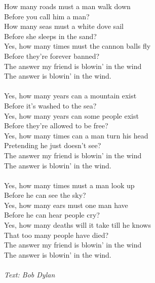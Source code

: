 \vspace{10pt}
How many roads must a man walk down\\
Before you call him a man?\\
How many seas must a white dove sail\\
Before she sleeps in the sand?\\
Yes, how many times must the cannon balls fly\\
Before they're forever banned?\\
The answer my friend is blowin' in the wind\\
The answer is blowin' in the wind.\\
\\
Yes, how many years can a mountain exist\\
Before it's washed to the sea?\\
Yes, how many years can some people exist\\
Before they're allowed to be free?\\
Yes, how many times can a man turn his head\\
Pretending he just doesn't see?\\
The answer my friend is blowin' in the wind\\
The answer is blowin' in the wind.\\
\\
Yes, how many times must a man look up\\
Before he can see the sky?\\
Yes, how many ears must one man have\\
Before he can hear people cry?\\
Yes, how many deaths will it take till he knows\\
That too many people have died?\\
The answer my friend is blowin' in the wind\\
The answer is blowin' in the wind.\\
\\
{\footnotesize\textit{Text: Bob Dylan}}
